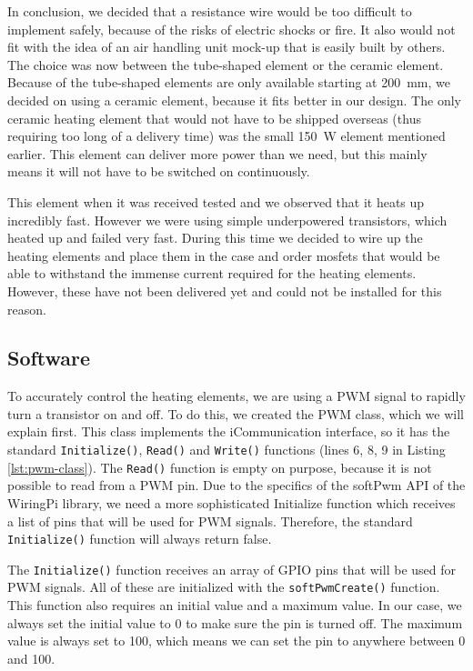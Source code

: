 \documentclass[a4paper,oneside]{book}
\begin{document}
In conclusion, we decided that a resistance wire would be too difficult to
implement safely, because of the risks of electric shocks or fire. It also
would not fit with the idea of an air handling unit mock-up that is easily
built by others. The choice was now between the tube-shaped element or the
ceramic element. Because of the tube-shaped elements are only available
starting at \SI{200}{\mm}, we decided on using a ceramic element, because it
fits better in our design. The only ceramic heating element that would not have
to be shipped overseas (thus requiring too long of a delivery time) was the
small \SI{150}{\W} element mentioned earlier. This element can deliver more
power than we need, but this mainly means it will not have to be switched on
continuously.

This element when it was received tested and we observed that it heats up
incredibly fast. However we were using simple underpowered transistors, which
heated up and failed very fast. During this time we decided to wire up the
heating elements and place them in the case and order mosfets that would be
able to withstand the immense current required for the heating elements.
However, these have not been delivered yet and could not be installed for this
reason.

\subsection{Software}
To accurately control the heating elements, we are using a PWM signal to
rapidly turn a transistor on and off. To do this, we created the PWM class,
which we will explain first. This class implements the iCommunication
interface, so it has the standard \lstinline|Initialize()|, \lstinline|Read()|
and \lstinline|Write()| functions (lines 6, 8, 9 in Listing
\ref{lst:pwm-class}). The \lstinline|Read()| function is empty on purpose,
because it is not possible to read from a PWM pin. Due to the specifics of the
softPwm API of the WiringPi library, we need a more sophisticated Initialize
function which receives a list of pins that will be used for PWM signals.
Therefore, the standard \lstinline|Initialize()| function will always return
false.



The \lstinline|Initialize()| function receives an array of GPIO pins that will
be used for PWM signals. All of these are initialized with the
\lstinline|softPwmCreate()| function.  This function also requires an initial
value and a maximum value. In our case, we always set the initial value to 0 to
make sure the pin is turned off. The maximum value is always set to 100, which
means we can set the pin to anywhere between 0 and 100.
\end{document}
